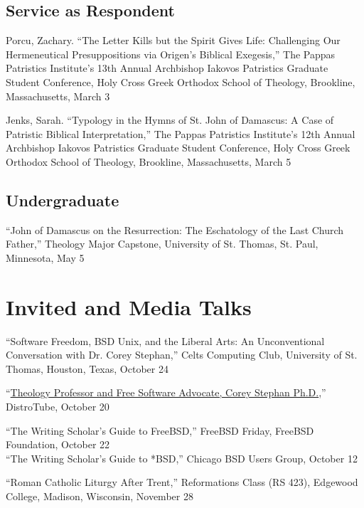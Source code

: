 \documentclass[letterpaper,12pt]{article}
\newcommand{\years}[1]{%
  {\reversemarginpar\strut\marginnote{{\small#1}}}%
}
\begin{document}
{{{{{{{\subsection*{Service as Respondent}

\years{2017}%
%
Porcu, Zachary. ``The Letter Kills but the Spirit Gives Life: Challenging Our Hermeneutical Presuppositions via Origen's Biblical Exegesis,'' The Pappas Patristics Institute's 13th Annual Archbishop Iakovos Patristics Graduate Student Conference, Holy Cross Greek Orthodox School of Theology, Brookline, Massachusetts, March 3 \\ [.3cm]
%
\years{2016}%
%
Jenks, Sarah. ``Typology in the Hymns of St. John of Damascus: A Case of Patristic Biblical Interpretation,'' The Pappas Patristics Institute's 12th Annual Archbishop Iakovos Patristics Graduate Student Conference, Holy Cross Greek Orthodox School of Theology, Brookline, Massachusetts, March 5

\subsection*{Undergraduate}

\years{2014}%
%
``John of Damascus on the Resurrection: The Eschatology of the Last Church Father,'' Theology Major Capstone, University of St. Thomas, St. Paul, Minnesota, May 5

\section*{Invited and Media Talks}

\years{2023}%
%
``Software Freedom, BSD Unix, and the Liberal Arts: An Unconventional Conversation with Dr. Corey Stephan,'' Celts Computing Club, University of St. Thomas, Houston, Texas, October 24 \\ [.3cm]
%
\years{2022}%
%
``\href{https://odysee.com/@DistroTube:2/theology-professor-and-free-software:b}{Theology Professor and Free Software Advocate, Corey Stephan Ph.D.},'' DistroTube, October 20 \\ [.3cm]
%
\years{2021}%
%
``The Writing Scholar’s Guide to FreeBSD,'' FreeBSD Friday, FreeBSD Foundation, October 22 \\ [.3cm]
%
``The Writing Scholar’s Guide to *BSD,'' Chicago BSD Users Group, October 12 \\ [.3cm]
%
\years{2017}%
%
``Roman Catholic Liturgy After Trent,'' Reformations Class (RS 423), Edgewood College, Madison, Wisconsin, November 28

}}}}}}}
\end{document}
